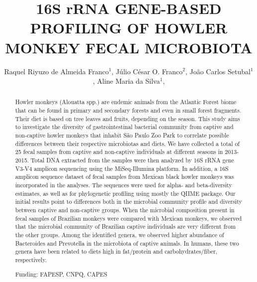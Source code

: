 \documentclass[twoside]{article}
\title{\vspace{-15mm}\fontsize{24pt}{10pt}\selectfont\textbf{ 16S rRNA GENE-BASED PROFILING OF HOWLER MONKEY FECAL MICROBIOTA }} %
\author{ Raquel Riyuzo de Almeida Franco$^{1}$, Júlio César O. Franco$^{2}$, João Carlos Setubal$^{1}$, Aline Maria da Silva$^{1}$, }
\affil{ 1 USP

2 Unifesp

 }
\date{}
\begin{document}
  
  
  \maketitle %
  
  
  \thispagestyle{fancy} %
  
  
  \begin{abstract}
  Howler monkeys (Alouatta spp.) are endemic animals from the Atlantic Forest biome that can be found in primary and secondary forests and even in small forest fragments. Their diet is based on tree leaves and fruits, depending on the season. This study aims to investigate the diversity of gastrointestinal bacterial community from captive and non-captive howler monkeys that inhabit S\~ao Paulo Zoo Park to correlate possible differences between their respective microbiotas and diets. We have collected a total of 25 fecal samples from captive and non-captive individuals at different seasons in 2013-2015. Total DNA extracted from the samples were then analyzed by 16S rRNA gene V3-V4 amplicon sequencing using the MiSeq-Illumina platform. In addition, a 16S amplicon sequence dataset of fecal samples from Mexican black howler monkeys was incorporated in the analyses. The sequences were used for alpha- and beta-diversity estimates, as well as for phylogenetic profiling using mostly the QIIME package. Our initial results point to differences both in the microbial community profile and diversity between captive and non-captive groups. When the microbial composition present in fecal samples of Brazilian monkeys were compared with Mexican monkeys, we observed that the microbial community of Brazilian captive individuals are very different from the other groups. Among the identified genera, we observed higher abundance of Bacteroides and Prevotella in the microbiota of captive animals. In humans, these two genera have been related to diets high in fat/protein and carbohydrates/fiber, respectively.
  
  Funding: FAPESP, CNPQ, CAPES \\ 
  \end{abstract}
  
\end{document}
